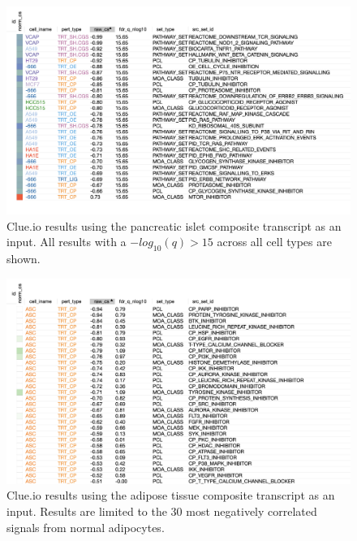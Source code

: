 \documentclass[
]{article}
\begin{document}
\begin{figure}[ht!]
\includegraphics[width=\textwidth]{Figures/Supp_Fig_Islet_all_cell_types.png} 
\caption{Clue.io results using the pancreatic islet composite transcript as 
an input. All results with a $-log_{10}(q) > 15$ across all cell types are shown.
}
\label{fig:clue_islet_all}
\end{figure}

\begin{figure}[ht!]
\includegraphics[width=\textwidth]{Figures/Supp_Fig_Adipose_ASC.png} 
\caption{Clue.io results using the adipose tissue composite transcript as 
an input. Results are limited to the 30 most negatively correlated signals
from normal adipocytes.
}
\label{fig:clue_adipose_asc}
\end{figure}
\end{document}
